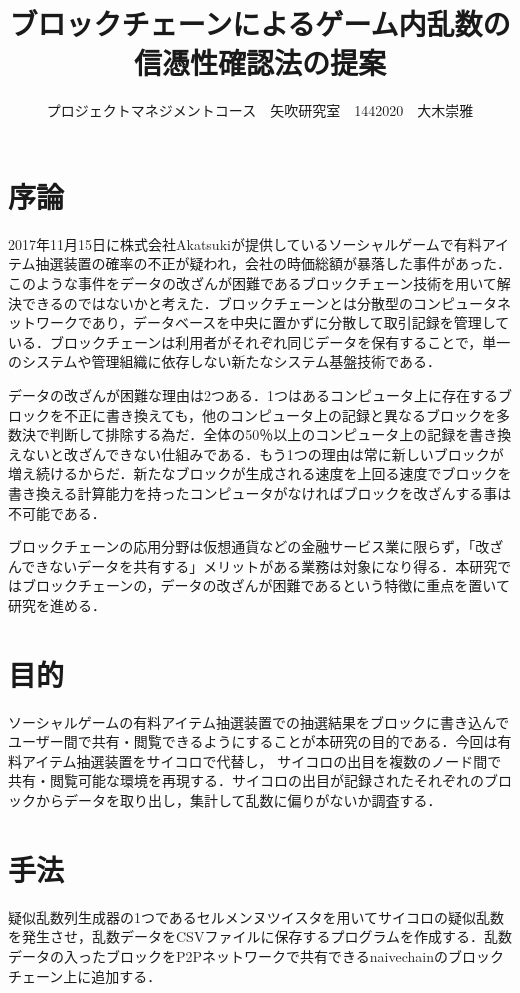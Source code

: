 \documentclass[uplatex,twocolumn,dvipdfmx]{jsarticle}
\title{\vspace{-5mm}\fontsize{14pt}{0pt}\selectfont ブロックチェーンによるゲーム内乱数の信憑性確認法の提案}
\author{\normalsize プロジェクトマネジメントコース　矢吹研究室　1442020　大木崇雅}
\date{}
\begin{document}
\fontsize{10.5pt}{\baselineskip}\selectfont
\maketitle





\section{序論}



2017年11月15日に株式会社Akatsukiが提供しているソーシャルゲームで有料アイテム抽選装置の確率の不正が疑われ，会社の時価総額が暴落した事件があった．このような事件をデータの改ざんが困難であるブロックチェーン技術を用いて解決できるのではないかと考えた．ブロックチェーンとは分散型のコンピュータネットワークであり，データベースを中央に置かずに分散して取引記録を管理している\cite{a}．ブロックチェーンは利用者がそれぞれ同じデータを保有することで，単一のシステムや管理組織に依存しない新たなシステム基盤技術である．

データの改ざんが困難な理由は2つある．1つはあるコンピュータ上に存在するブロックを不正に書き換えても，他のコンピュータ上の記録と異なるブロックを多数決で判断して排除する為だ．全体の50％以上のコンピュータ上の記録を書き換えないと改ざんできない仕組みである\cite{c}．もう1つの理由は常に新しいブロックが増え続けるからだ．新たなブロックが生成される速度を上回る速度でブロックを書き換える計算能力を持ったコンピュータがなければブロックを改ざんする事は不可能である．

ブロックチェーンの応用分野は仮想通貨などの金融サービス業に限らず，「改ざんできないデータを共有する」メリットがある業務は対象になり得る．本研究ではブロックチェーンの，データの改ざんが困難であるという特徴に重点を置いて研究を進める．


\section{目的}
ソーシャルゲームの有料アイテム抽選装置での抽選結果をブロックに書き込んでユーザー間で共有・閲覧できるようにすることが本研究の目的である．今回は有料アイテム抽選装置をサイコロで代替し，
サイコロの出目を複数のノード間で共有・閲覧可能な環境を再現する．サイコロの出目が記録されたそれぞれのブロックからデータを取り出し，集計して乱数に偏りがないか調査する．

\section{手法}
疑似乱数列生成器の1つであるセルメンヌツイスタを用いてサイコロの疑似乱数を発生させ，乱数データをCSVファイルに保存するプログラムを作成する．乱数データの入ったブロックをP2Pネットワークで共有できるnaivechainのブロックチェーン上に追加する．
\end{document}
